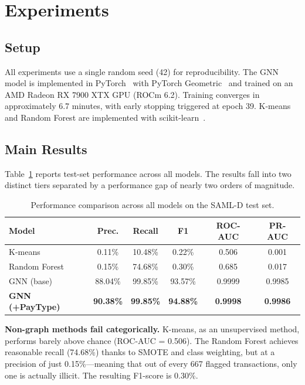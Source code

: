 \documentclass[conference]{IEEEtran}
\begin{document}
\section{Experiments}\label{sec:experiments}

\subsection{Setup}

All experiments use a single random seed (42) for reproducibility. The GNN model is implemented in PyTorch~\cite{paszke2019pytorch} with PyTorch Geometric~\cite{fey2019pyg} and trained on an AMD Radeon RX 7900 XTX GPU (ROCm 6.2). Training converges in approximately 6.7 minutes, with early stopping triggered at epoch 39. K-means and Random Forest are implemented with scikit-learn~\cite{pedregosa2011sklearn}.

\subsection{Main Results}

Table~\ref{tab:main} reports test-set performance across all models. The results fall into two distinct tiers separated by a performance gap of nearly two orders of magnitude.

\begin{table}[htbp]
\caption{Performance comparison across all models on the SAML-D test set.}
\label{tab:main}
\centering
\begin{tabular}{@{}lccccc@{}}
\toprule
Model & Prec. & Recall & F1 & ROC-AUC & PR-AUC \\
\midrule
K-means & 0.11\% & 10.48\% & 0.22\% & 0.506 & 0.001 \\
Random Forest & 0.15\% & 74.68\% & 0.30\% & 0.685 & 0.017 \\
\midrule
GNN (base) & 88.04\% & 99.85\% & 93.57\% & 0.9999 & 0.9985 \\
\textbf{GNN (+PayType)} & \textbf{90.38\%} & \textbf{99.85\%} & \textbf{94.88\%} & \textbf{0.9998} & \textbf{0.9986} \\
\bottomrule
\end{tabular}
\end{table}

\textbf{Non-graph methods fail categorically.} K-means, as an unsupervised method, performs barely above chance (ROC-AUC = 0.506). The Random Forest achieves reasonable recall (74.68\%) thanks to SMOTE and class weighting, but at a precision of just 0.15\%---meaning that out of every 667 flagged transactions, only one is actually illicit. The resulting F1-score is 0.30\%.
\end{document}
